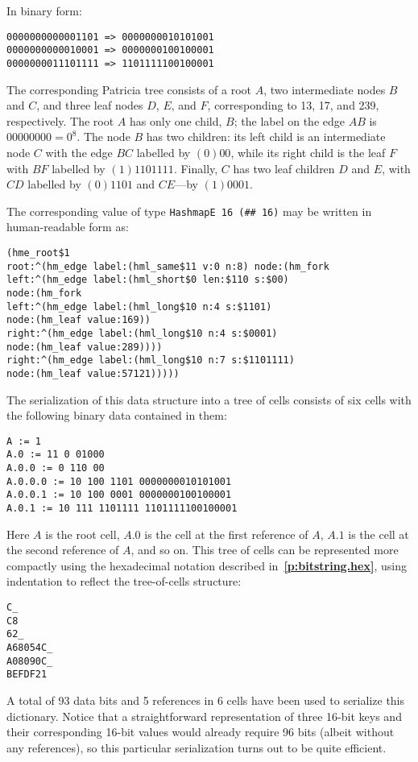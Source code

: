 \documentclass[12pt,oneside]{article}
\def\refpoint#1{{\rm\textbf{\ref{#1}}}}
\let\ptref=\refpoint
\begin{document}
In binary form:
\begin{verbatim}
0000000000001101 => 0000000010101001
0000000000010001 => 0000000100100001
0000000011101111 => 1101111100100001
\end{verbatim}

The corresponding Patricia tree consists of a root $A$, two intermediate nodes $B$ and $C$, and three leaf nodes $D$, $E$, and $F$, corresponding to 13, 17, and 239, respectively. The root $A$ has only one child, $B$; the label on the edge $AB$ is $00000000=0^8$. The node $B$ has two children: its left child is an intermediate node $C$ with the edge $BC$ labelled by $(0)00$, while its right child is the leaf $F$ with $BF$ labelled by $(1)1101111$. Finally, $C$ has two leaf children $D$ and $E$, with $CD$ labelled by $(0)1101$ and $CE$---by $(1)0001$.

The corresponding value of type {\tt HashmapE 16 (\#\# 16)} may be written in human-readable form as:
\begin{verbatim}
(hme_root$1
root:^(hm_edge label:(hml_same$11 v:0 n:8) node:(hm_fork
left:^(hm_edge label:(hml_short$0 len:$110 s:$00)
node:(hm_fork
left:^(hm_edge label:(hml_long$10 n:4 s:$1101)
node:(hm_leaf value:169))
right:^(hm_edge label:(hml_long$10 n:4 s:$0001)
node:(hm_leaf value:289))))
right:^(hm_edge label:(hml_long$10 n:7 s:$1101111)
node:(hm_leaf value:57121)))))
\end{verbatim}

The serialization of this data structure into a tree of cells consists of six cells with the following binary data contained in them:
\begin{verbatim}
A := 1
A.0 := 11 0 01000
A.0.0 := 0 110 00
A.0.0.0 := 10 100 1101 0000000010101001
A.0.0.1 := 10 100 0001 0000000100100001
A.0.1 := 10 111 1101111 1101111100100001
\end{verbatim}
Here $A$ is the root cell, $A.0$ is the cell at the first reference of $A$, $A.1$ is the cell at the second reference of $A$, and so on. This tree of cells can be represented more compactly using the hexadecimal notation described in~\ptref{p:bitstring.hex}, using indentation to reflect the tree-of-cells structure:
\begin{verbatim}
C_
C8
62_
A68054C_
A08090C_
BEFDF21
\end{verbatim}
A total of 93 data bits and 5 references in 6 cells have been used to serialize this dictionary. Notice that a straightforward representation of three 16-bit keys and their corresponding 16-bit values would already require 96 bits (albeit without any references), so this particular serialization turns out to be quite efficient.
\end{document}
